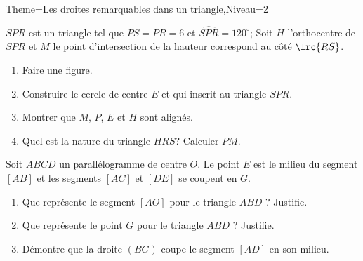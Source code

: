 \documentclass[a4paper,12pt]{article}
\begin{document}
\begin{Maquette}[Fiche]{Theme=Les droites remarquables dans un triangle,Niveau=2}
\begin{exercice}
$SPR$ est un triangle tel que $PS=PR=6$ et $\widehat{SPR}=120^{\circ}$; Soit $H$ l'orthocentre de $SPR$ et $M$ le point d'intersection de la hauteur correspond au côté $\lrc{RS}$.
\begin{enumerate}
\item Faire une figure.
\item Construire le cercle de centre $E$ et qui  inscrit au triangle $SPR$.
\item Montrer que $M$, $P$, $E$ et $H$ sont alignés.
\item Quel est la nature du triangle $HRS$? Calculer $PM$.
\end{enumerate}
\end{exercice}

\begin{exercice}
Soit $ABCD$ un parallélogramme de centre $O$. Le point $E$ est le milieu du segment $[AB]$ et les segments $[AC]$
et $[DE]$ se coupent en $G$.
\begin{enumerate}
\item Que représente le segment $[AO]$ pour le triangle $ABD$ ? Justifie.
\item Que représente le point $G$ pour le triangle $ABD$ ? Justifie.
\item Démontre que la droite $(BG)$ coupe le segment $[AD]$ en son milieu.
\end{enumerate}
\end{exercice}



\end{Maquette}
\end{document}
